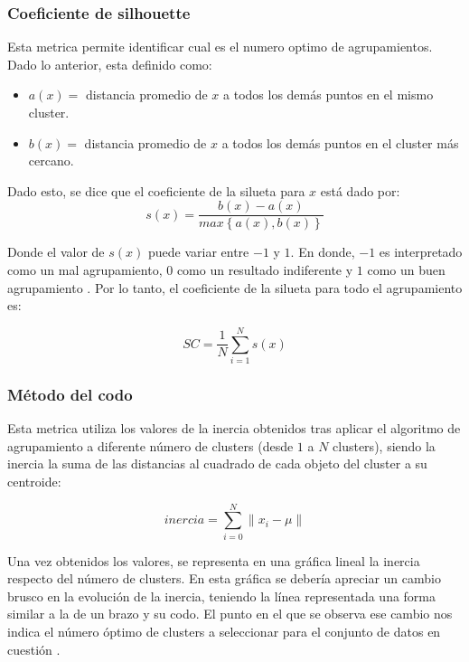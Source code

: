 \subsubsection{Coeficiente de silhouette} 
Esta metrica permite identificar cual es el numero optimo de agrupamientos. Dado lo anterior, esta definido como:
\begin{itemize}[label=]
		\item $a(x)=$ distancia promedio de $x$ a todos los demás puntos en el mismo cluster.
		\item $b(x)=$ distancia promedio de $x$ a todos los demás puntos en el cluster más cercano.
\end{itemize}
Dado esto, se dice que el coeficiente de la silueta para $x$ está dado por:
\begin{equation}
	s(x) = \frac{b(x)-a(x)}{max\left\lbrace a(x), b(x) \right\rbrace }
\end{equation}

Donde el valor de $s(x)$ puede variar entre $-1$ y $1$. En donde, $-1$ es interpretado como un mal agrupamiento, $0$ como un resultado indiferente y $1$ como un buen agrupamiento \cite{Ramirez2018}. Por lo tanto, el coeficiente de la silueta para todo el agrupamiento es:
	
\begin{equation}
	SC = \frac{1}{N} \sum_{i = 1}^{N}s(x)
\end{equation}
\subsubsection{Método del codo}
Esta metrica utiliza los valores de la inercia obtenidos tras aplicar el algoritmo de agrupamiento a diferente número de clusters (desde $1$ a $N$ clusters), siendo la inercia la suma de las distancias al cuadrado de cada objeto del cluster a su centroide:
	
\begin{equation}
	inercia = \sum_{i = 0}^{N}  \parallel x_{i} - \mu  \parallel
\end{equation}
	
Una vez obtenidos los valores, se representa en una gráfica lineal la inercia respecto del número de clusters. En esta gráfica se debería apreciar un cambio brusco en la evolución de la inercia, teniendo la línea representada una forma similar a la de un brazo y su codo. El punto en el que se observa ese cambio nos indica el número óptimo de clusters a seleccionar para el conjunto de datos en cuestión \cite{Moya2022}. 

